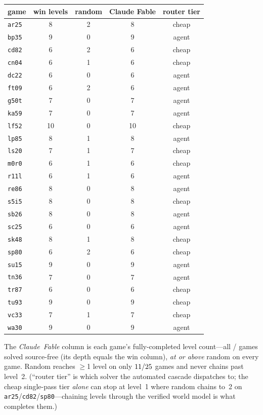 \documentclass[11pt]{article}
\begin{document}
\begin{center}\small
\begin{tabular}{@{}lcccc@{}}
\toprule
game & win levels & random & Claude Fable & router tier \\
\midrule
\texttt{ar25} & 8 & 2 & 8 & cheap \\
\texttt{bp35} & 9 & 0 & 9 & agent \\
\texttt{cd82} & 6 & 2 & 6 & cheap \\
\texttt{cn04} & 6 & 1 & 6 & cheap \\
\texttt{dc22} & 6 & 0 & 6 & agent \\
\texttt{ft09} & 6 & 2 & 6 & agent \\
\texttt{g50t} & 7 & 0 & 7 & agent \\
\texttt{ka59} & 7 & 0 & 7 & agent \\
\texttt{lf52} & 10 & 0 & 10 & cheap \\
\texttt{lp85} & 8 & 1 & 8 & agent \\
\texttt{ls20} & 7 & 1 & 7 & cheap \\
\texttt{m0r0} & 6 & 1 & 6 & cheap \\
\texttt{r11l} & 6 & 1 & 6 & agent \\
\texttt{re86} & 8 & 0 & 8 & agent \\
\texttt{s5i5} & 8 & 0 & 8 & cheap \\
\texttt{sb26} & 8 & 0 & 8 & agent \\
\texttt{sc25} & 6 & 0 & 6 & agent \\
\texttt{sk48} & 8 & 1 & 8 & cheap \\
\texttt{sp80} & 6 & 2 & 6 & cheap \\
\texttt{su15} & 9 & 0 & 9 & agent \\
\texttt{tn36} & 7 & 0 & 7 & agent \\
\texttt{tr87} & 6 & 0 & 6 & cheap \\
\texttt{tu93} & 9 & 0 & 9 & cheap \\
\texttt{vc33} & 7 & 1 & 7 & cheap \\
\texttt{wa30} & 9 & 0 & 9 & agent \\
\bottomrule
\end{tabular}
\end{center}
\noindent The \emph{Claude~Fable} column is each game's fully-completed level count---all
\ArcFableFull/\ArcUnionGames{} games solved source-free (its depth equals the win column), \emph{at or
above} random on every game. Random reaches $\geq$1 level on only $11/25$ games
and never chains past level~2. (``router tier'' is which solver the automated cascade dispatches to; the
cheap single-pass tier \emph{alone} can stop at level~1 where random chains to~2 on
\texttt{ar25}/\texttt{cd82}/\texttt{sp80}---chaining levels through the verified world model is what
completes them.)
\end{document}
